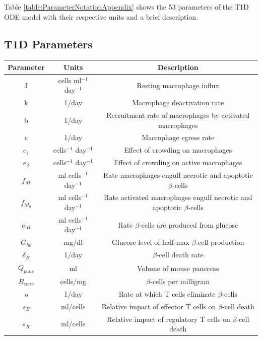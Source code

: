\begin{appendices}
\vspace{3mm}
Table \ref{table:ParameterNotationAppendix} shows the 53 parameters of the T1D ODE model with their respective units and a brief description.
\subsection{T1D Parameters}
\begin{table}[H] 
\centering
        \hspace*{-2.0cm}\begin{tabular}{c|c|c}
        \cline{1-3}
            \textbf{Parameter}  & \textbf{Units} &\textbf{Description}\\
            \hline
            J & cells ml$^{-1}$ day$^{-1}$ & Resting macrophage influx\\
            k & 1/day & Macrophage deactivation rate\\
            b & 1/day & Recruitment rate of macrophages by activated macrophages\\
            c & 1/day & Macrophage egress rate\\
            $e_1$ & cells$^{-1}$ day$^{-1}$ & Effect of crowding on macrophages\\
            $e_2$ & cells$^{-1}$ day$^{-1}$ & Effect of crowding on active macrophages\\
            $f_M$ & ml cells$^{-1}$ day$^{-1}$ & Rate macrophages engulf necrotic and apoptotic $\beta$-cells\\
            $f_{M_a}$ & ml cells$^{-1}$ day$^{-1}$ & Rate activated macrophages engulf necrotic and apoptotic $\beta$-cells\\
            $\alpha_B$ & ml cells$^{-1}$ day$^{-1}$ & Rate $\beta$-cells are produced from glucose\\
            $G_{hb}$ & mg/dl & Glucose level of half-max $\beta$-cell production\\
            $\delta_B$ & 1/day & $\beta$-cell death rate\\
            $Q_{panc}$ & ml & Volume of mouse pancreas\\
            $B_{conv}$ & cells/mg & $\beta$-cells per milligram\\
            $\eta$ & 1/day & Rate at which T cells eliminate $\beta$-cells\\
            $s_E$ & ml/cells & Relative impact of effector T cells on $\beta$-cell death\\
            $s_R$ & ml/cells & Relative impact of regulatory T cells on $\beta$-cell death\\

\end{tabular}
\end{table}
\end{appendices}
